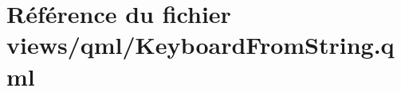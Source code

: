 \hypertarget{KeyboardFromString_8qml}{\section{Référence du fichier views/qml/\-Keyboard\-From\-String.qml}
\label{KeyboardFromString_8qml}
}
